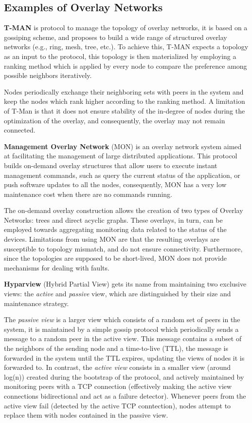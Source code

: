 \subsection{Examples of Overlay Networks}

\textbf{T-MAN} \cite{jelasity2005t} is protocol to manage the topology of overlay networks, it is based on a gossiping scheme, and proposes to build a wide range of structured overlay networks (e.g., ring, mesh, tree, etc.). To achieve this, T-MAN expects a topology as an input to the protocol, this topology is then materialized by employing a ranking method which is applied by every node to compare the preference among possible neighbors iteratively. 

Nodes periodically exchange their neighboring sets with peers in the system and keep the nodes which rank higher according to the ranking method. A limitation of T-Man is that it does not ensure stability of the in-degree of nodes during the optimization of the overlay, and consequently, the overlay may not remain connected. 

\textbf{Management Overlay Network} \cite{liang2005mon} (MON) is an overlay network system aimed at facilitating the management of large distributed applications. This protocol builds on-demand overlay structures that allow users to execute instant management commands, such as query the current status of the application, or push software updates to all the nodes, consequently, MON has a very low maintenance cost when there are no commands running.

The on-demand overlay construction allows the creation of two types of Overlay Networks: trees and direct acyclic graphs. These overlays, in turn, can be employed towards aggregating monitoring data related to the status of the devices. Limitations from using MON are that the resulting overlays are susceptible to topology mismatch, and do not ensure connectivity. Furthermore, since the topologies are supposed to be short-lived, MON does not provide mechanisms for dealing with faults.

\textbf{Hyparview} \cite{Hyparview} (Hybrid Partial View) gets its name from maintaining two exclusive views: the \textit{active} and \textit{passive} view, which are distinguished by their size and maintenance strategy. 

The \textit{passive view} is a larger view which consists of a random set of peers in the system, it is maintained by a simple gossip protocol which periodically sends a message to a random peer in the active view. This message contains a subset of the neighbors of the sending node and a time-to-live (TTL), the message is forwarded in the system until the TTL expires, updating the views of nodes it is forwarded to. In contrast, the \textit{active view} consists in a smaller view (around log(n)) created during the bootstrap of the protocol, and actively maintained by monitoring peers with a TCP connection (effectively making the active view connections bidirectional and act as a failure detector). Whenever peers from the active view fail (detected by the active TCP conntection), nodes attempt to replace them with nodes contained in the passive view.

